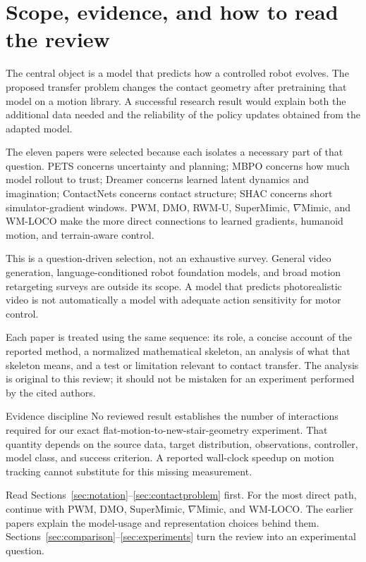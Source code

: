 \section{Scope, evidence, and how to read the review}
The central object is a model that predicts how a controlled robot evolves. The
proposed transfer problem changes the contact geometry after pretraining that
model on a motion library. A successful research result would explain both the
additional data needed and the reliability of the policy updates obtained from
the adapted model.

The eleven papers were selected because each isolates a necessary part of that
question. PETS concerns uncertainty and planning; MBPO concerns how much model
rollout to trust; Dreamer concerns learned latent dynamics and imagination;
ContactNets concerns contact structure; SHAC concerns short simulator-gradient
windows. PWM, DMO, RWM-U, SuperMimic, $\nabla$Mimic, and WM-LOCO make the more direct
connections to learned gradients, humanoid motion, and terrain-aware control.

This is a question-driven selection, not an exhaustive survey. General video
generation, language-conditioned robot foundation models, and broad motion
retargeting surveys are outside its scope. A model that predicts photorealistic
video is not automatically a model with adequate action sensitivity for motor control.

Each paper is treated using the same sequence: its role, a concise account of
the reported method, a normalized mathematical skeleton, an analysis of what
that skeleton means, and a test or limitation relevant to contact transfer.
The analysis is original to this review; it should not be mistaken for an
experiment performed by the cited authors.

\begin{limitation}{Evidence discipline}
No reviewed result establishes the number of interactions required for our exact
flat-motion-to-new-stair-geometry experiment. That quantity depends on the
source data, target distribution, observations, controller, model class, and
success criterion. A reported wall-clock speedup on motion tracking cannot
substitute for this missing measurement.
\end{limitation}

Read Sections~\ref{sec:notation}--\ref{sec:contactproblem} first. For the most
direct path, continue with PWM, DMO, SuperMimic, $\nabla$Mimic, and WM-LOCO.
The earlier papers explain the model-usage and representation choices behind
them. Sections~\ref{sec:comparison}--\ref{sec:experiments} turn the review into
an experimental question.

